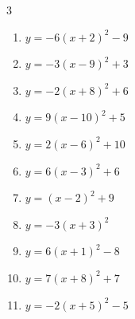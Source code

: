 \begin{multicols}{3}
\begin{enumerate}
        \phantom{$\displaystyle 頂点\left( 4 , -10 \right)$}

  \item $\displaystyle y=-6\left( x+2\right)^{2}-9$

        \phantom{$\displaystyle 頂点\left( -2 , -9 \right)$}

  \item $\displaystyle y=-3\left( x-9\right)^{2}+3$

        \phantom{$\displaystyle 頂点\left( 9 , 3 \right)$}

\columnbreak %

\resetques

  \item $\displaystyle y=-2\left( x+8\right)^{2}+6$

        \phantom{$\displaystyle 頂点\left( -8 , 6 \right)$}

  \item $\displaystyle y=9\left( x-10\right)^{2}+5$

        \phantom{$\displaystyle 頂点\left( 10 , 5 \right)$}

  \item $\displaystyle y=2\left( x-6\right)^{2}+10$

        \phantom{$\displaystyle 頂点\left( 6 , 10 \right)$}

  \item $\displaystyle y=6\left( x-3\right)^{2}+6$

        \phantom{$\displaystyle 頂点\left( 3 , 6 \right)$}

  \item $\displaystyle y=\left( x-2\right)^{2}+9$

        \phantom{$\displaystyle 頂点\left( 2 , 9 \right)$}

  \item $\displaystyle y=-3\left( x+3\right)^{2}$

        \phantom{$\displaystyle 頂点\left( -3 , 0 \right)$}

  \item $\displaystyle y=6\left( x+1\right)^{2}-8$

        \phantom{$\displaystyle 頂点\left( -1 , -8 \right)$}

  \item $\displaystyle y=7\left( x+8\right)^{2}+7$

        \phantom{$\displaystyle 頂点\left( -8 , 7 \right)$}

  \item $\displaystyle y=-2\left( x+5\right)^{2}-5$


\end{enumerate}
\end{multicols}

